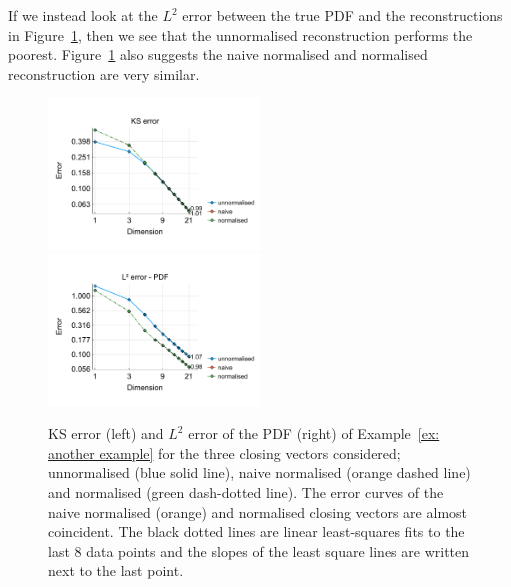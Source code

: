 \begin{example}
If we instead look at the \(L^2\) error between the true PDF and the reconstructions in Figure~\ref{fig: fun 2 ks error qbdrap closing vecs}, then we see that the unnormalised reconstruction performs the poorest. Figure~\ref{fig: fun 2 ks error qbdrap closing vecs} also suggests the naive normalised and normalised reconstruction are very similar. 
\begin{figure}[h]
	\centering
	\includegraphics[width=0.5\textwidth,trim={0.5cm 0.8cm 0.2cm 1.25cm},clip]{chapter6/figs/qbdrap_closing_vec/fun2/ks_error_formatted.pdf}%
	\includegraphics[width=0.5\textwidth,trim={0.5cm 0.8cm 0.2cm 1.25cm},clip]{chapter6/figs/qbdrap_closing_vec/fun2/l2_pdf_error_formatted.pdf}
	\caption{KS error (left) and \(L^2\) error of the PDF (right) of Example~\ref{ex: another example} for the three closing vectors considered; unnormalised (blue solid line), naive normalised (orange dashed line) and normalised (green dash-dotted line). The error curves of the naive normalised (orange) and normalised closing vectors are almost coincident. The black dotted lines are linear least-squares fits to the last 8 data points and the slopes of the least square lines are written next to the last point.}%
	\label{fig: fun 2 ks error qbdrap closing vecs}
\end{figure} 
\exampleFloatBarrier
\end{example}

